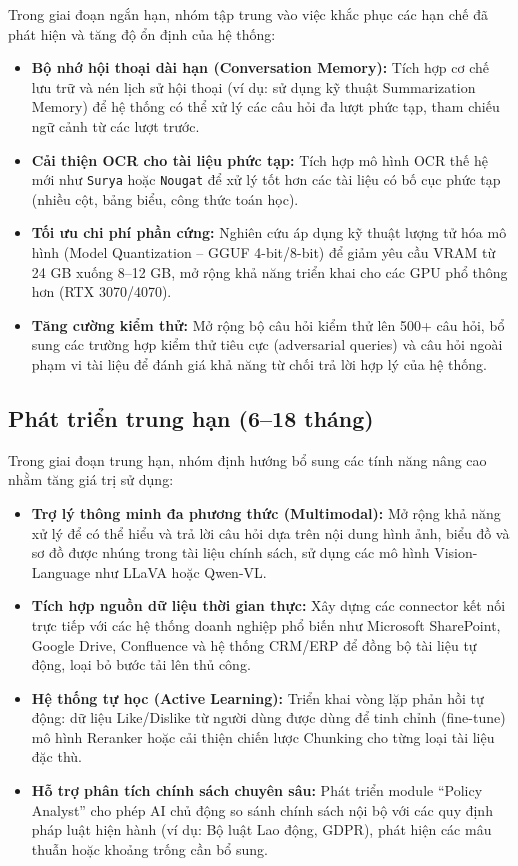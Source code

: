 \documentclass[12pt,a4paper]{report}
\begin{document}
Trong giai đoạn ngắn hạn, nhóm tập trung vào việc khắc phục các hạn chế đã phát hiện và tăng độ ổn định của hệ thống:

\begin{itemize}
    \item \textbf{Bộ nhớ hội thoại dài hạn (Conversation Memory):} Tích hợp cơ chế lưu trữ và nén lịch sử hội thoại (ví dụ: sử dụng kỹ thuật Summarization Memory) để hệ thống có thể xử lý các câu hỏi đa lượt phức tạp, tham chiếu ngữ cảnh từ các lượt trước.
    \item \textbf{Cải thiện OCR cho tài liệu phức tạp:} Tích hợp mô hình OCR thế hệ mới như \texttt{Surya} hoặc \texttt{Nougat} để xử lý tốt hơn các tài liệu có bố cục phức tạp (nhiều cột, bảng biểu, công thức toán học).
    \item \textbf{Tối ưu chi phí phần cứng:} Nghiên cứu áp dụng kỹ thuật lượng tử hóa mô hình (Model Quantization -- GGUF 4-bit/8-bit) để giảm yêu cầu VRAM từ 24 GB xuống 8--12 GB, mở rộng khả năng triển khai cho các GPU phổ thông hơn (RTX 3070/4070).
    \item \textbf{Tăng cường kiểm thử:} Mở rộng bộ câu hỏi kiểm thử lên 500+ câu hỏi, bổ sung các trường hợp kiểm thử tiêu cực (adversarial queries) và câu hỏi ngoài phạm vi tài liệu để đánh giá khả năng từ chối trả lời hợp lý của hệ thống.
\end{itemize}

\subsection{Phát triển trung hạn (6--18 tháng)}

Trong giai đoạn trung hạn, nhóm định hướng bổ sung các tính năng nâng cao nhằm tăng giá trị sử dụng:

\begin{itemize}
    \item \textbf{Trợ lý thông minh đa phương thức (Multimodal):} Mở rộng khả năng xử lý để có thể hiểu và trả lời câu hỏi dựa trên nội dung hình ảnh, biểu đồ và sơ đồ được nhúng trong tài liệu chính sách, sử dụng các mô hình Vision-Language như LLaVA hoặc Qwen-VL.
    \item \textbf{Tích hợp nguồn dữ liệu thời gian thực:} Xây dựng các connector kết nối trực tiếp với các hệ thống doanh nghiệp phổ biến như Microsoft SharePoint, Google Drive, Confluence và hệ thống CRM/ERP để đồng bộ tài liệu tự động, loại bỏ bước tải lên thủ công.
    \item \textbf{Hệ thống tự học (Active Learning):} Triển khai vòng lặp phản hồi tự động: dữ liệu Like/Dislike từ người dùng được dùng để tinh chỉnh (fine-tune) mô hình Reranker hoặc cải thiện chiến lược Chunking cho từng loại tài liệu đặc thù.
    \item \textbf{Hỗ trợ phân tích chính sách chuyên sâu:} Phát triển module ``Policy Analyst'' cho phép AI chủ động so sánh chính sách nội bộ với các quy định pháp luật hiện hành (ví dụ: Bộ luật Lao động, GDPR), phát hiện các mâu thuẫn hoặc khoảng trống cần bổ sung.
\end{itemize}
\end{document}
